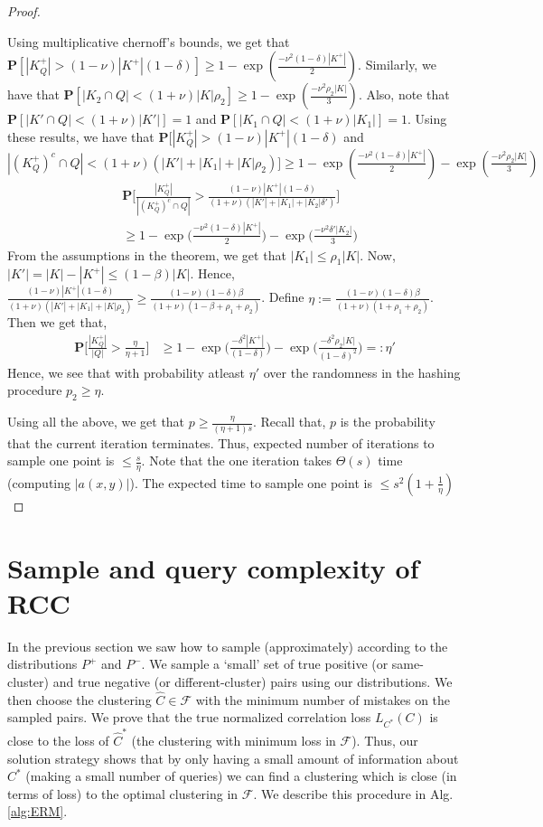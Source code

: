 \documentclass[12pt]{article}
\newcommand{\mb}{\mathbf}
\newcommand{\mc}{\mathcal}
\begin{document}
\begin{proof}
\begin{enumerate}[label=\textbf{T.\arabic*}]
Using multiplicative chernoff's bounds, we get that $\mb P[|K_Q^+| > (1-\nu)|K^+|(1-\delta) ] \ge 1 - \exp(\frac{-\nu^2 (1-\delta) |K^+|}{2})$. Similarly, we have that $\mb P[|K_2 \cap Q| < (1+\nu)|K| \rho_2] \ge 1 - \exp(\frac{-\nu^2 \rho_2 |K|}{3})$. Also, note that $\mb P[|K' \cap Q| < (1+\nu)|K'|] = 1$ and $\mb P[|K_1 \cap Q| < (1+\nu)|K_1|] = 1$. Using these results, we have that $\mb P[|K_Q^+| > (1-\nu)|K^+|(1-\delta)$ and $|(K^+_Q)^c \cap Q| < (1+\nu)(|K'|+|K_1|+|K|\rho_2)] \ge 1 - \exp(\frac{-\nu^2 (1-\delta) |K^+|}{2}) - \exp(\frac{-\nu^2 \rho_2 |K|}{3})$
\begin{align*}
  &\mb P\bigg[\frac{|K^+_Q|}{|(K^+_Q)^c \cap Q|} > \frac{(1-\nu)|K^+|(1-\delta)}{(1+\nu)(|K'|+|K_1|+|K_2|\delta')} \bigg] \\
  &\ge 1 - \exp\Big(\frac{-\nu^2 (1-\delta) |K^+|}{2}\Big) - \exp\Big(\frac{-\nu^2 \delta' |K_2|}{3}\Big)
\end{align*}
From the assumptions in the theorem, we get that $|K_1| \le \rho_1|K|$. Now, $|K'| = |K| - |K^+| \le (1-\beta)|K|$. Hence, $\frac{(1-\nu)|K^+|(1-\delta)}{(1+\nu)(|K'|+|K_1|+|K|\rho_2)} \ge \frac{(1-\nu)(1-\delta)\beta}{(1+\nu)(1-\beta + \rho_1 + \rho_2)}$. Define $\eta := \frac{(1-\nu)(1-\delta)\beta}{(1+\nu)(1 + \rho_1 + \rho_2)}$. Then we get that,
\begin{align*}
  \mb P\bigg[\frac{|K^+_Q|}{|Q|} > \frac{\eta}{\eta+1}\bigg] &\ge 1- \exp\Big(\frac{- \delta^2 |K^+|}{(1-\delta)}\Big) - \exp\Big(\frac{-\delta^2\rho_2 |K|}{(1-\delta)^2}\Big) =: \eta'
\end{align*}
Hence, we see that with probability atleast $\eta'$ over the randomness in the hashing procedure $p_2 \ge \eta$.   
\end{enumerate}
Using all the above, we get that $p \ge \frac{\eta}{(\eta+1)s}$. Recall that, $p$ is the probability that the current iteration terminates. Thus, expected number of iterations to sample one point is $\le \frac{s}{\eta}$. Note that the one iteration takes $\Theta(s)$ time (computing $|a(x, y)|$). The expected time to sample one point is  $\le s^2(1 + \frac{1}{\eta})$ 
\end{proof}


\section{Sample and query complexity of RCC}
\label{section:sampleAndQueryComplexity}
In the previous section we saw how to sample (approximately) according to the distributions $P^+$ and $P^-$. We sample a `small' set of true positive (or same-cluster) and true negative (or different-cluster) pairs using our distributions. We then choose the clustering $\hat C \in \mc F$ with the minimum number of mistakes on the sampled pairs. We prove that the true normalized correlation loss $L_{C^*}(C)$ is close to the loss of $\hat C^*$ (the clustering with minimum loss in $\mc F$). Thus, our solution strategy shows that by only having a small amount of information about $C^*$ (making a small number of queries) we can find a clustering which is close (in terms of loss) to the optimal clustering in $\mc F$. We describe this procedure in Alg. \ref{alg:ERM}. 
\end{document}
